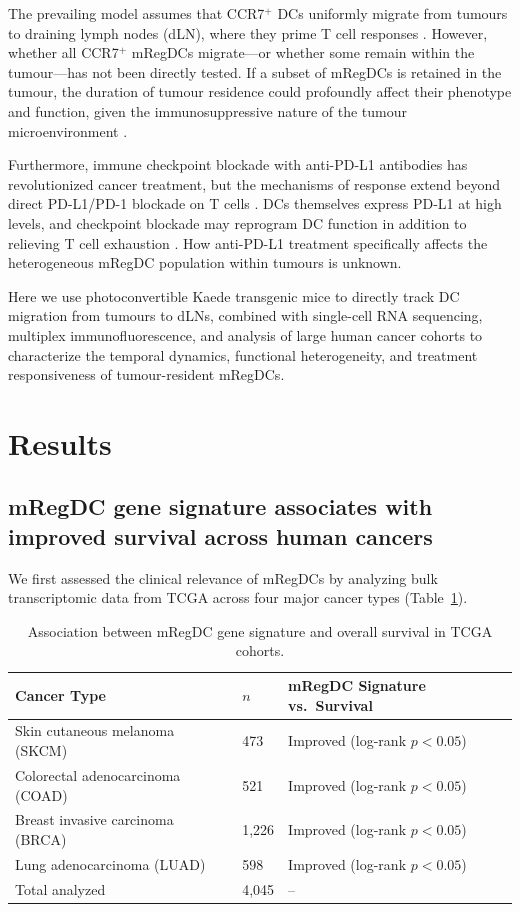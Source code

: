 \documentclass[11pt]{article}
\begin{document}
The prevailing model assumes that CCR7$^{+}$ DCs uniformly migrate from tumours to draining lymph nodes (dLN), where they prime T cell responses \citep{Roberts2016,Salmon2016}. However, whether all CCR7$^{+}$ mRegDCs migrate---or whether some remain within the tumour---has not been directly tested. If a subset of mRegDCs is retained in the tumour, the duration of tumour residence could profoundly affect their phenotype and function, given the immunosuppressive nature of the tumour microenvironment \citep{Veglia2021,DeVito2019}.

Furthermore, immune checkpoint blockade with anti-PD-L1 antibodies has revolutionized cancer treatment, but the mechanisms of response extend beyond direct PD-L1/PD-1 blockade on T cells \citep{Herbst2014,Zou2016}. DCs themselves express PD-L1 at high levels, and checkpoint blockade may reprogram DC function in addition to relieving T cell exhaustion \citep{Oh2020,Garris2018}. How anti-PD-L1 treatment specifically affects the heterogeneous mRegDC population within tumours is unknown.

Here we use photoconvertible Kaede transgenic mice to directly track DC migration from tumours to dLNs, combined with single-cell RNA sequencing, multiplex immunofluorescence, and analysis of large human cancer cohorts to characterize the temporal dynamics, functional heterogeneity, and treatment responsiveness of tumour-resident mRegDCs.

\section{Results}

\subsection{mRegDC gene signature associates with improved survival across human cancers}

We first assessed the clinical relevance of mRegDCs by analyzing bulk transcriptomic data from TCGA across four major cancer types (Table~\ref{tab:tcga}).

\begin{table}[ht]
\centering
\caption{Association between mRegDC gene signature and overall survival in TCGA cohorts.}
\label{tab:tcga}
\begin{tabular}{lll}
\toprule
Cancer Type & $n$ & mRegDC Signature vs.\ Survival \\
\midrule
Skin cutaneous melanoma (SKCM) & 473 & Improved (log-rank $p < 0.05$) \\
Colorectal adenocarcinoma (COAD) & 521 & Improved (log-rank $p < 0.05$) \\
Breast invasive carcinoma (BRCA) & 1,226 & Improved (log-rank $p < 0.05$) \\
Lung adenocarcinoma (LUAD) & 598 & Improved (log-rank $p < 0.05$) \\
\midrule
Total analyzed & 4,045 & -- \\
\bottomrule
\end{tabular}
\end{table}
\end{document}
